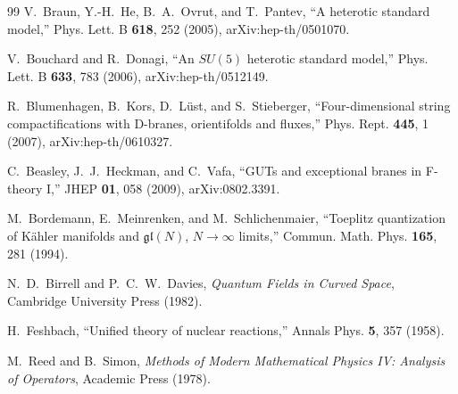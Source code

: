 \documentclass[aps,prd,preprint,notitlepage,nofootinbib,superscriptaddress,floatfix]{revtex4-2}
\theoremstyle{remark}
\begin{document}
\begin{thebibliography}{99}
V.~Braun, Y.-H.~He, B.~A.~Ovrut, and T.~Pantev,
``A heterotic standard model,''
Phys. Lett. B \textbf{618}, 252 (2005),
arXiv:hep-th/0501070.

V.~Bouchard and R.~Donagi,
``An \(SU(5)\) heterotic standard model,''
Phys. Lett. B \textbf{633}, 783 (2006),
arXiv:hep-th/0512149.

R.~Blumenhagen, B.~Kors, D.~L\"ust, and S.~Stieberger,
``Four-dimensional string compactifications with D-branes, orientifolds and fluxes,''
Phys. Rept. \textbf{445}, 1 (2007),
arXiv:hep-th/0610327.

C.~Beasley, J.~J.~Heckman, and C.~Vafa,
``GUTs and exceptional branes in F-theory I,''
JHEP \textbf{01}, 058 (2009),
arXiv:0802.3391.

M.~Bordemann, E.~Meinrenken, and M.~Schlichenmaier,
``Toeplitz quantization of K\"ahler manifolds and \(\mathfrak{gl}(N)\), \(N\to\infty\) limits,''
Commun. Math. Phys. \textbf{165}, 281 (1994).

N.~D.~Birrell and P.~C.~W.~Davies,
\textit{Quantum Fields in Curved Space},
Cambridge University Press (1982).

H.~Feshbach,
``Unified theory of nuclear reactions,''
Annals Phys. \textbf{5}, 357 (1958).

M.~Reed and B.~Simon,
\textit{Methods of Modern Mathematical Physics IV: Analysis of Operators},
Academic Press (1978).

\end{thebibliography}
\end{document}
